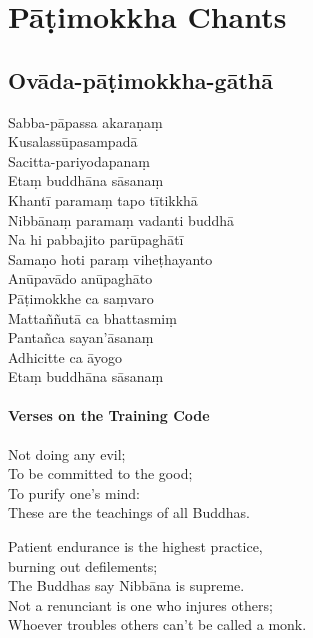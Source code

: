 \chapter{Pāṭimokkha Chants}

\section{Ovāda-pāṭimokkha-gāthā}

\begin{leader}
\end{leader}


Sabba-pāpassa akaraṇaṃ\\
Kusalassūpasampadā\\
Sacitta-pariyodapanaṃ\\
Etaṃ buddhāna sāsanaṃ\\
Khantī paramaṃ tapo tītikkhā\\
Nibbānaṃ paramaṃ vadanti buddhā\\
Na hi pabbajito parūpaghātī\\
Samaṇo hoti paraṃ viheṭhayanto\\
Anūpavādo anūpaghāto\\
Pāṭimokkhe ca saṃvaro\\
Mattaññutā ca bhattasmiṃ\\
Pantañca sayan'āsanaṃ\\
Adhicitte ca āyogo\\
Etaṃ buddhāna sāsanaṃ


\subsubsection{Verses on the Training Code}

Not doing any evil;\\
To be committed to the good;\\
To purify one's mind:\\
These are the teachings of all Buddhas.

Patient endurance is the highest practice,\\
\vin burning out defilements;\\
The Buddhas say Nibbāna is supreme.\\
Not a renunciant is one who injures others;\\
Whoever troubles others can't be called a monk.\\


